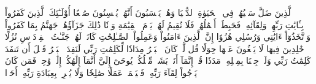 ٱلَّذِينَ ضَلَّ سَعۡيُهُمۡ فِي ٱلۡحَيَوٰةِ ٱلدُّنۡيَا وَهُمۡ يَحۡسَبُونَ أَنَّهُمۡ يُحۡسِنُونَ صُنۡعًا
أُوْلَـٰٓئِكَ ٱلَّذِينَ كَفَرُواْ بِـَٔايَٰتِ رَبِّهِمۡ وَلِقَآئِهِۦ فَحَبِطَتۡ أَعۡمَٰلُهُمۡ فَلَا نُقِيمُ لَهُمۡ يَوۡمَ ٱلۡقِيَٰمَةِ وَزۡنٗا
ذَٰلِكَ جَزَآؤُهُمۡ جَهَنَّمُ بِمَا كَفَرُواْ وَٱتَّخَذُوٓاْ ءَايَٰتِي وَرُسُلِي هُزُوًا
إِنَّ ٱلَّذِينَ ءَامَنُواْ وَعَمِلُواْ ٱلصَّـٰلِحَٰتِ كَانَتۡ لَهُمۡ جَنَّـٰتُ ٱلۡفِرۡدَوۡسِ نُزُلًا
خَٰلِدِينَ فِيهَا لَا يَبۡغُونَ عَنۡهَا حِوَلٗا
قُل لَّوۡ كَانَ ٱلۡبَحۡرُ مِدَادٗا لِّكَلِمَٰتِ رَبِّي لَنَفِدَ ٱلۡبَحۡرُ قَبۡلَ أَن تَنفَدَ كَلِمَٰتُ رَبِّي وَلَوۡ جِئۡنَا بِمِثۡلِهِۦ مَدَدٗا
قُلۡ إِنَّمَآ أَنَا۠ بَشَرٞ مِّثۡلُكُمۡ يُوحَىٰٓ إِلَيَّ أَنَّمَآ إِلَٰهُكُمۡ إِلَٰهٞ وَٰحِدٞۖ فَمَن كَانَ يَرۡجُواْ لِقَآءَ رَبِّهِۦ فَلۡيَعۡمَلۡ عَمَلٗا صَٰلِحٗا وَلَا يُشۡرِكۡ بِعِبَادَةِ رَبِّهِۦٓ أَحَدَۢا